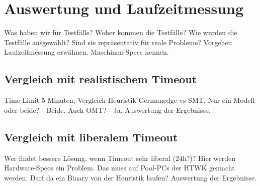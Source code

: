 \chapter{Auswertung und Laufzeitmessung}
\label{chapter:auswertung}

Was haben wir für Testfälle?
Woher kommen die Testfälle?
Wie wurden die Testfälle ausgewählt?
Sind sie repräsentativ für reale Probleme?
Vorgehen Laufzeitmessung erwähnen.
Maschinen-Specs nennen.

\section{Vergleich mit realistischem Timeout}
Time-Limit 5 Minuten, Vergleich Heuristik Germanedge vs SMT.
Nur ein Modell oder beide? - Beide.
Auch OMT? - Ja.
Auswertung der Ergebnisse.

\section{Vergleich mit liberalem Timeout}
Wer findet bessere Lösung, wenn Timeout sehr liberal (24h?)?
Hier werden Hardware-Specs ein Problem.
Das muss auf Pool-PCs der HTWK gemacht werden.
Darf da ein Binary von der Heuristik laufen?
Auswertung der Ergebnisse.
